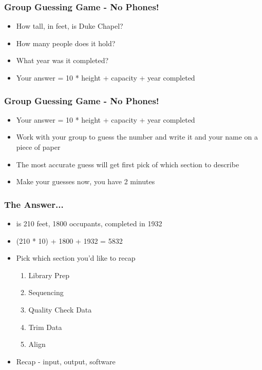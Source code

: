 \documentclass[14pt,handout]{beamer}
\begin{document}
\begin{frame}
\frametitle{Group Guessing Game - No Phones!}
\begin{itemize}
	\item<+-> How tall, in feet, is Duke Chapel?
	\item<+-> How many people does it hold?
	\item<+-> What year was it completed?
	\item<+-> Your answer = 10 * height + capacity + year completed
\end{itemize}
\end{frame}

\begin{frame}
\frametitle{Group Guessing Game - No Phones!}
\begin{itemize}
	\item<+-> Your answer = 10 * height + capacity + year completed
	\item<+-> Work with your group to guess the number and write it and your name on a piece of paper
	\item<+-> The most accurate guess will get first pick of which section to describe
	\item<+-> Make your guesses now, you have 2 minutes
\end{itemize}
\end{frame}

\begin{frame}
\frametitle{The Answer...}
\begin{itemize}
	\item<+-> is 210 feet, 1800 occupants, completed in 1932
	\item<+-> (210 * 10) + 1800 + 1932 = 5832
	\item<+-> Pick which section you'd like to recap
	\begin{enumerate}
		\item<+-> Library Prep
		\item<+-> Sequencing
		\item<+-> Quality Check Data
		\item<+-> Trim Data
		\item<+-> Align
	\end{enumerate}
	\item<+-> Recap - input, output, software
\end{itemize}
\end{frame}
\end{document}
